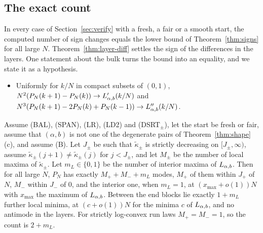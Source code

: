 \subsection{The exact count}\label{sec:count}

In every case of Section~\ref{sec:verify} with a fresh, a fair or a smooth start, the computed
number of sign changes equals the lower bound of Theorem~\ref{thm:signs} for all large $N$.
Theorem~\ref{thm:layer-diff} settles the sign of the differences in the layers. One statement
about the bulk turns the bound into an equality, and we state it as a hypothesis.
\begin{itemize}[leftmargin=4em,labelsep=0.8em]
\item[(B)] Uniformly for $k/N$ in compact subsets of $(0,1)$,
$N^2(P_N(k+1)-P_N(k))\to L_{\alpha,b}'(k/N)$ and $N^3(P_N(k+1)-2P_N(k)+P_N(k-1))\to L_{\alpha,b}''(k/N)$.
\end{itemize}

\begin{proposition}\label{prop:count}
Assume (BAL), (SPAN), (LR), (LD2) and (DSRT$_\pm$), let the start be fresh or fair, assume
that $(\alpha,b)$ is not one of the degenerate pairs of Theorem~\ref{thm:shape}(c), and assume
(B). Let $J_\pm$ be such that $\widetilde\kappa_\pm$ is strictly decreasing on $[J_\pm,\infty)$,
assume $\widetilde\kappa_\pm(j+1)\ne\widetilde\kappa_\pm(j)$ for $j<J_\pm$, and let $M_\pm$ be the number
of local maxima of $\widetilde\kappa_\pm$. Let $m_L\in\{0,1\}$ be the number of interior maxima of
$L_{\alpha,b}$. Then for all large $N$, $P_N$ has exactly $M_\plus+M_\minus+m_L$ modes, $M_\plus$ of them
within $J_\plus$ of $N$, $M_\minus$ within $J_\minus$ of $0$, and the interior one, when
$m_L=1$, at $(x_{\max}+o(1))N$ with $x_{\max}$ the maximum of $L_{\alpha,b}$. Between the end blocks
lie exactly $1+m_L$ further local minima, at $(c+o(1))N$ for the minima $c$ of $L_{\alpha,b}$, and
no antimode in the layers. For strictly log-convex run laws $M_\plus=M_\minus=1$, so the count
is $2+m_L$.
\end{proposition}

